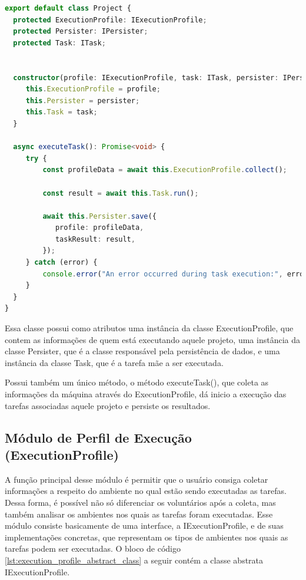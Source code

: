 \documentclass[12pt]{tcc}
\begin{document}
\begin{lstlisting}[label={lst:project_class}, caption={Implementação da classe responsável por representar um projeto.}, language=TypeScript, breaklines=true]
export default class Project {
  protected ExecutionProfile: IExecutionProfile;
  protected Persister: IPersister;
  protected Task: ITask;


  constructor(profile: IExecutionProfile, task: ITask, persister: IPersister) {
     this.ExecutionProfile = profile;
     this.Persister = persister;
     this.Task = task;
  }

  async executeTask(): Promise<void> {
     try {
         const profileData = await this.ExecutionProfile.collect();

         const result = await this.Task.run();

         await this.Persister.save({
            profile: profileData,
            taskResult: result,
         });
     } catch (error) {
         console.error("An error occurred during task execution:", error);
     }
  }
}
\end{lstlisting}

Essa classe possui como atributos uma instância da classe ExecutionProfile, que contem as informações de quem está executando aquele projeto, uma instância da classe Persister, que é a classe responsável pela persistência de dados, e uma instância da classe Task, que é a tarefa mãe a ser executada.

Possui também um único método, o método executeTask(), que coleta as informações da máquina através do ExecutionProfile, dá inicio a execução das tarefas associadas aquele projeto e persiste os resultados.

\subsection{Módulo de Perfil de Execução (ExecutionProfile)}
\label{subsection:modulo-execution-profile}

A função principal desse módulo é permitir que o usuário consiga coletar informações a respeito do ambiente no qual estão sendo executadas as tarefas. Dessa forma, é possível não só diferenciar os voluntários após a coleta, mas também analisar os ambientes nos quais as tarefas foram executadas. Esse módulo consiste basicamente de uma interface, a IExecutionProfile, e de suas implementações concretas, que representam os tipos de ambientes nos quais as tarefas podem ser executadas. O bloco de código \ref{lst:execution_profile_abstract_class} a seguir contém a classe abstrata IExecutionProfile.
\end{document}
